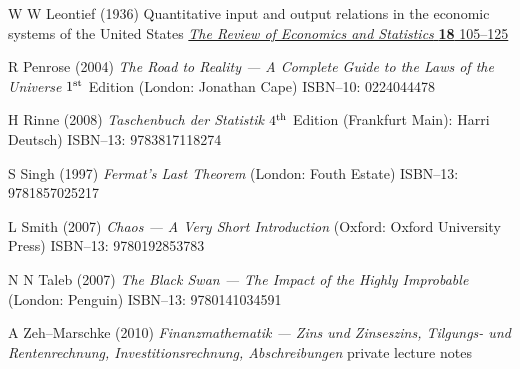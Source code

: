 \begin{thebibliography}{99}
W W Leontief
(1936) Quantitative input and output relations in the economic 
systems of the United States
\href{http://dx.doi.org/10.2307/1927837}{\emph{The Review of 
Economics and Statistics} {\bf 18} 105--125}

R Penrose
(2004) \emph{The Road to Reality --- A Complete Guide to the Laws
of the Universe}
$1^{\rm st}$ Edition (London: Jonathan Cape) ISBN--10: 0224044478

H Rinne
(2008) \emph{Taschenbuch der Statistik}
$4^{\rm th}$ Edition (Frankfurt Main): Harri Deutsch)
ISBN--13: 9783817118274



S Singh
(1997) \emph{Fermat's Last Theorem}
(London: Fouth Estate) ISBN--13: 9781857025217

L Smith
(2007) \emph{Chaos --- A Very Short Introduction}
(Oxford: Oxford University Press) ISBN--13: 9780192853783

N N Taleb
(2007) \emph{The Black Swan --- The Impact of the Highly
Improbable} (London: Penguin)
ISBN--13: 9780141034591

A Zeh--Marschke
(2010) \emph{Finanzmathematik --- Zins und Zinseszins, Tilgungs- 
und Rentenrechnung, Investitionsrechnung, Abschreibungen}
private lecture notes

\end{thebibliography}

